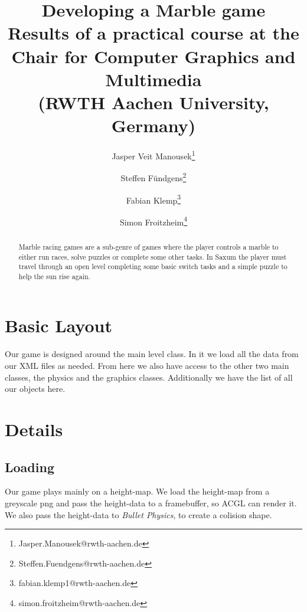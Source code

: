 \documentclass[sponsored]{acmsiggraph}
\title{Developing a Marble game \\ \large \normalfont Results of a practical
course at the Chair for Computer Graphics and Multimedia \\ (RWTH Aachen
University, Germany)}
\author{Jasper Veit Manousek\thanks{Jasper.Manousek@rwth-aachen.de} 
\and    Steffen F\"undgens\thanks{Steffen.Fuendgens@rwth-aachen.de} 
\and    Fabian Klemp\thanks{fabian.klemp1@rwth-aachen.de} 
\and    Simon Froitzheim\thanks{simon.froitzheim@rwth-aachen.de} }
\begin{document}

\maketitle

\begin{abstract}

Marble racing games are a sub-genre of games where the player controls a marble to either run races, solve puzzles or complete some other tasks. In Saxum the player must travel through an open level completing some basic switch tasks and a simple puzzle to help the sun rise again.
 
\end{abstract}

\section{Basic Layout}

Our game is designed around the main level class. In it we load all the data from our XML files as needed. From here we also have access to the other two main classes, the physics and the graphics classes. Additionally we have the list of all our objects here.

\section{Details}

\subsection{Loading}

Our game plays mainly on a height-map. We load the height-map from a greyscale png and pass the height-data to a framebuffer, so ACGL can render it. We also pass the height-data to \textit{Bullet Physics}, to create a colision shape.
\end{document}
